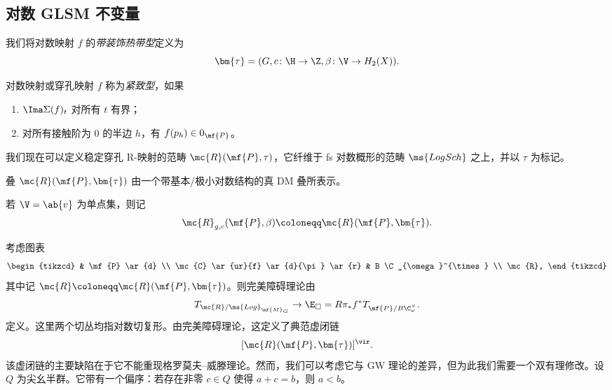 \subsection{对数 GLSM 不变量}%
\label{sub:Log GLSM invariants}

\begin{defn}
    我们将对数映射 \(f\) 的\textit{带装饰热带型}定义为
    \[ \bm{\tau} = (G, c \colon \H \to \Z, \beta \colon \V \to H_2(X)). \]
\end{defn}

\begin{defn}
    对数映射或穿孔映射 \(f\) 称为\textit{紧致型}，如果
    \begin{enumerate}
        \item \(\Ima \Sigma(f)_t\) 对所有 \(t\) 有界；
        \item 对所有接触阶为 \(0\) 的半边 \(h\)，有 \(f(p_h) \in 0_{\mf{P}}\)。
    \end{enumerate}
\end{defn}

我们现在可以定义稳定穿孔 R-映射的范畴 \(\mc{R}(\mf{P}, \tau)\)，它纤维于 fs 对数概形的范畴 \(\ms{LogSch}\) 之上，并以 \(\tau\) 为标记。

\begin{thm}
    叠 \(\mc{R}(\mf{P},\bm{\tau})\) 由一个带基本/极小对数结构的真 DM 叠所表示。
\end{thm}

\begin{rmk}
    若 \(\V = \ab\{v\}\) 为单点集，则记
    \[ \mc{R}_{g, c}(\mf{P}, \beta) \coloneqq \mc{R}(\mf{P}, \bm{\tau}). \]
\end{rmk}

考虑图表
\begin{equation*}
\begin{tikzcd}
    & \mf{P} \ar{d} \\
    \mc{C} \ar{ur}{f} \ar{d}{\pi} \ar{r} & B \C_{\omega}^{\times} \\
    \mc{R},
\end{tikzcd}
\end{equation*}
其中记 \(\mc{R} \coloneqq \mc{R}(\mf{P}, \bm{\tau})\)。则完美障碍理论由
\[ T_{\mc{R}/\ms{Log}_{\mf{M}_G}} \to \E_{\square} = R \pi_* f^* T_{\mf{P}/B\C_{\omega}^{\times}}. \]
定义。这里两个切丛均指对数切复形。由完美障碍理论，这定义了典范虚闭链
\[ [\mc{R}(\mf{P}, \bm{\tau})]^{\vir}. \]
该虚闭链的主要缺陷在于它不能重现格罗莫夫--威滕理论。然而，我们可以考虑它与 GW 理论的差异，但为此我们需要一个双有理修改。设 \(Q\) 为尖幺半群。它带有一个偏序：若存在非零 \(c \in Q\) 使得 \(a+c = b\)，则 \(a < b\)。

